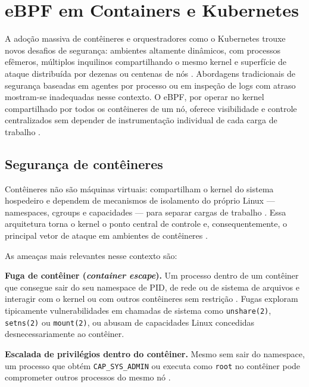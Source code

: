 \chapter{eBPF em Containers e Kubernetes}
\label{cap:containers}

A adoção massiva de contêineres e orquestradores como o Kubernetes trouxe novos
desafios de segurança: ambientes altamente dinâmicos, com processos efêmeros,
múltiplos inquilinos compartilhando o mesmo kernel e superfície de ataque
distribuída por dezenas ou centenas de nós \cite{cassagnes2020}.
Abordagens tradicionais de segurança baseadas em agentes por processo ou em
inspeção de logs com atraso mostram-se inadequadas nesse contexto.
O eBPF, por operar no kernel compartilhado por todos os contêineres de um nó,
oferece visibilidade e controle centralizados sem depender de instrumentação
individual de cada carga de trabalho \cite{linuxkernel2024}.

\section{Segurança de contêineres}

Contêineres não são máquinas virtuais: compartilham o kernel do sistema hospedeiro
e dependem de mecanismos de isolamento do próprio Linux — namespaces, cgroups e
capacidades — para separar cargas de trabalho \cite{linuxkernel2024}.
Essa arquitetura torna o kernel o ponto central de controle e, consequentemente,
o principal vetor de ataque em ambientes de contêineres \cite{gregg2020}.

As ameaças mais relevantes nesse contexto são:

\textbf{Fuga de contêiner (\textit{container escape}).}
Um processo dentro de um contêiner que consegue sair do seu namespace de PID,
de rede ou de sistema de arquivos e interagir com o kernel ou com outros contêineres
sem restrição \cite{linuxkernel2024}.
Fugas exploram tipicamente vulnerabilidades em chamadas de sistema como
\texttt{unshare(2)}, \texttt{setns(2)} ou \texttt{mount(2)}, ou abusam de
capacidades Linux concedidas desnecessariamente ao contêiner.

\textbf{Escalada de privilégios dentro do contêiner.}
Mesmo sem sair do namespace, um processo que obtém \texttt{CAP\_SYS\_ADMIN}
ou executa como \texttt{root} no contêiner pode comprometer outros processos do
mesmo nó \cite{gregg2019}.

